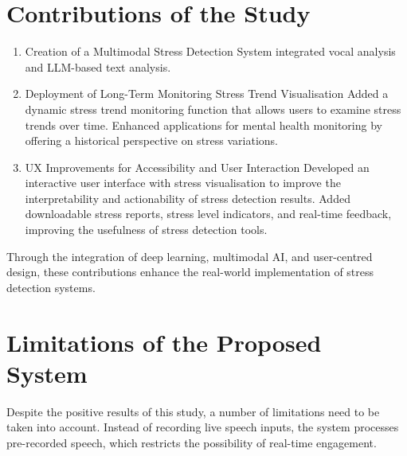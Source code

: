 \documentclass[Arial,12pt,openright,twoside]{book}
\begin{document}
  \section{Contributions of the Study}
   \begin{enumerate}
   \item Creation of a Multimodal Stress Detection System integrated vocal analysis and LLM-based text analysis.  
 \item Deployment of Long-Term Monitoring Stress Trend Visualisation 
 Added a dynamic stress trend monitoring function that allows users to examine stress trends over time. 
Enhanced applications for mental health monitoring by offering a historical perspective on stress variations. 
 \item UX Improvements for Accessibility and User Interaction 
Developed an interactive user interface with stress visualisation to improve the interpretability and actionability of stress detection results. 
Added downloadable stress reports, stress level indicators, and real-time feedback, improving the usefulness of stress detection tools. 
\end{enumerate}
Through the integration of deep learning, multimodal AI, and user-centred design, these contributions enhance the real-world implementation of stress detection systems.
 
  \section{Limitations of the Proposed System}
Despite the positive results of this study, a number of limitations need to be taken into account. Instead of recording live speech inputs, the system processes pre-recorded speech, which restricts the possibility of real-time engagement.
 
\end{document}
